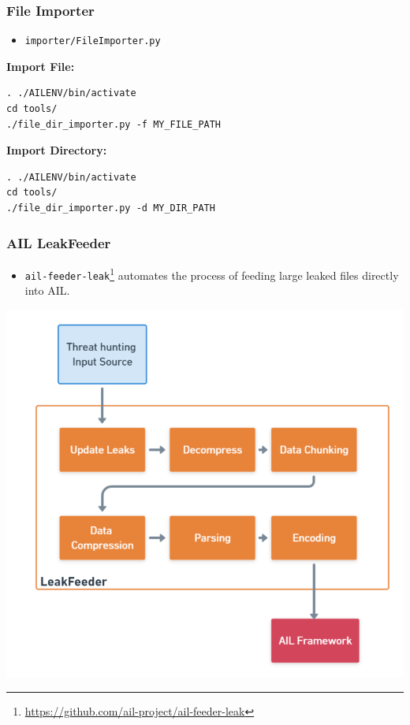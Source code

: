 \documentclass[10pt,aspectratio=169, colorlinks=true, linkcolor=circlBlue]{beamer}
\begin{document}
\begin{frame}[fragile]
    \frametitle{File Importer}

    \begin{itemize}
        \item \texttt{importer/FileImporter.py}
    \end{itemize}

    \textbf{Import File:}
    \begin{tcolorbox}[colback=black!85, coltext=green, title=Import a Single File, fonttitle=\bfseries, arc=2mm, boxrule=0.4pt]
\begin{verbatim}
. ./AILENV/bin/activate
cd tools/
./file_dir_importer.py -f MY_FILE_PATH
\end{verbatim}
    \end{tcolorbox}

    \vspace{0.3cm}

    \textbf{Import Directory:}
    \begin{tcolorbox}[colback=black!85, coltext=green, title=Import a Directory, fonttitle=\bfseries, arc=2mm, boxrule=0.4pt]
\begin{verbatim}
. ./AILENV/bin/activate
cd tools/
./file_dir_importer.py -d MY_DIR_PATH
\end{verbatim}
    \end{tcolorbox}

\end{frame}

\begin{frame}[fragile]
    \frametitle{AIL LeakFeeder}

    \begin{itemize}
        \item \texttt{ail-feeder-leak}\footnote{\url{https://github.com/ail-project/ail-feeder-leak}} automates the process of feeding large leaked files directly into AIL.
    \end{itemize}
    
    \centerline{\includegraphics[scale=0.20]{./images/feeder_leak.png}}
\end{frame}
\end{document}
